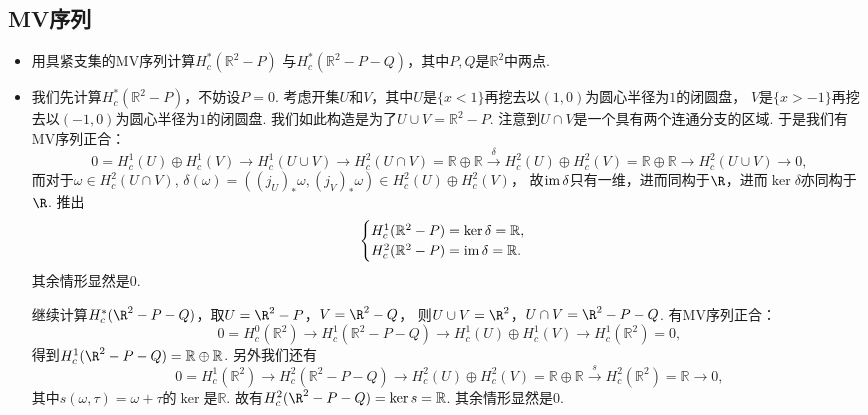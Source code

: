 \subsection{MV序列}
\begin{itemize}
    \item[3.1] 用具紧支集的MV序列计算$H^*_c(\mathbb{R}^2-P)$
    与$H^*_c(\mathbb{R}^2-P-Q)$，其中$P, Q$是$\mathbb{R}^2$中两点.
    \item[\textbf{解：}]
       
        \qquad 我们先计算$H^*_c(\mathbb{R}^2-P)$，不妨设$P=0$. 
        考虑开集$U$和$V$，其中$U$是$\{x<1\}$再挖去以$(1,0)$为圆心半径为$1$的闭圆盘，
        $V$是$\{x>-1\}$再挖去以$(-1,0)$为圆心半径为$1$的闭圆盘. 
        我们如此构造是为了$U\cup V=\mathbb{R}^2-P$. 
        注意到$U\cap V$是一个具有两个连通分支的区域. 于是我们有MV序列正合：
        $$0=H_c^1(U)\oplus H_c^1(V)\rightarrow H_c^1(U\cup V)
        \rightarrow H_c^2(U\cap V)=\mathbb{R}\oplus \mathbb{R}
        \stackrel{\delta}{\rightarrow} H_c^2(U)\oplus H_c^2(V)
        =\mathbb{R}\oplus \mathbb{R}\rightarrow H_c^2(U\cup V)\rightarrow 0,$$
        \qquad 而对于$\omega\in H_c^2(U\cap V)$, 
        $\delta(\omega)=((j_U)_*\omega, (j_V)_*\omega)\in H^2_c(U)\oplus H^2_c(V)$，
        故$\operatorname{im} \delta$只有一维，进而同构于$\R$，进而$\ker\delta$亦同构于$\R$.
        推出$$\begin{cases}
            H_c^1(\mathbb{R}^2-P)=\ker \delta=\mathbb{R},\\
            H_c^2(\mathbb{R}^2-P)=\operatorname{im} \delta=\mathbb{R}.
            \end{cases}$$
        其余情形显然是$0$.\par

        \qquad 继续计算$H^*_c(\R^2-P-Q)$，取$U=\R^2-P$，$V=\R^2-Q$，
        则$U\cup V=\R^2$，$U\cap V=\R^2-P-Q$. 有MV序列正合：
        $$0=H^0_c(\mathbb{R}^2)\rightarrow H^1_c(\mathbb{R}^2-P-Q)
        \rightarrow H^1_c(U)\oplus H^1_c(V)\rightarrow H^1_c(\mathbb{R}^2)=0,$$
        得到$H^1_c(\R^2-P-Q)=\mathbb{R}\oplus \mathbb{R}$. 另外我们还有
        $$0=H^1_c(\mathbb{R}^2)\rightarrow H^2_c(\mathbb{R}^2-P-Q)
        \rightarrow H^2_c(U)\oplus H^2_c(V)=\mathbb{R}\oplus \mathbb{R}
        \stackrel{s}{\rightarrow} H^2_c(\mathbb{R}^2)=\mathbb{R}\rightarrow 0,$$
        其中$s(\omega,\tau)=\omega+\tau$的$\ker$是$\mathbb{R}$. 
        故有$H^2_c(\R^2-P-Q)= \ker s=\mathbb{R}$. 
        其余情形显然是$0$.


    


\end{itemize}
